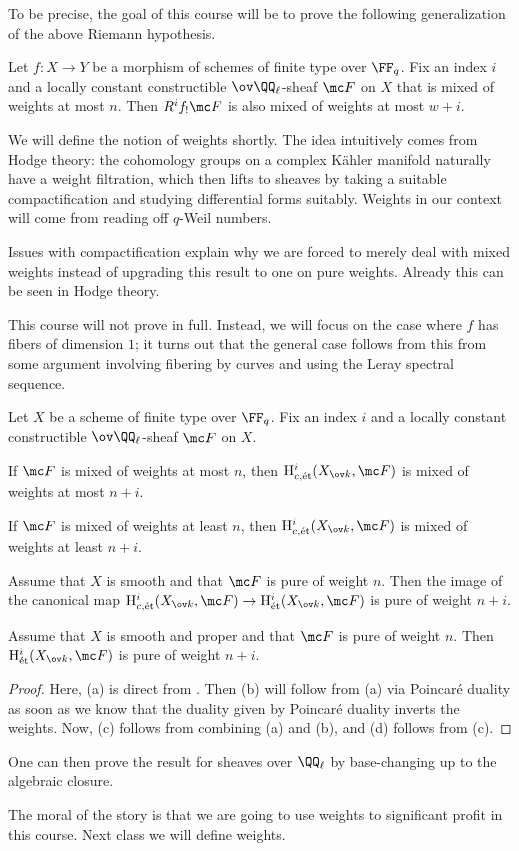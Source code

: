 \documentclass[../notes.tex]{subfiles}
\begin{document}
To be precise, the goal of this course will be to prove the following generalization of the above Riemann hypothesis.
\begin{theorem}[Deligne] \label{thm:weil-ii}
	Let $f\colon X\to Y$ be a morphism of schemes of finite type over $\FF_q$. Fix an index $i$ and a locally constant constructible $\ov\QQ_\ell$-sheaf $\mc F$ on $X$ that is mixed of weights at most $n$. Then $R^if_!\mc F$ is also mixed of weights at most $w+i$.
\end{theorem}
We will define the notion of weights shortly. The idea intuitively comes from Hodge theory: the cohomology groups on a complex K\"ahler manifold naturally have a weight filtration, which then lifts to sheaves by taking a suitable compactification and studying differential forms suitably. Weights in our context will come from reading off $q$-Weil numbers.
\begin{remark}
	Issues with compactification explain why we are forced to merely deal with mixed weights instead of upgrading this result to one on pure weights. Already this can be seen in Hodge theory.
\end{remark}
This course will not prove  in full. Instead, we will focus on the case where $f$ has fibers of dimension $1$; it turns out that the general case follows from this from some argument involving fibering by curves and using the Leray spectral sequence.
\begin{corollary}
	Let $X$ be a scheme of finite type over $\FF_q$. Fix an index $i$ and a locally constant constructible $\ov\QQ_\ell$-sheaf $\mc F$ on $X$.
	\begin{listalph}
		\item If $\mc F$ is mixed of weights at most $n$, then $\mathrm H^i_{c,\mathrm{\acute et}}(X_{\ov k},\mc F)$ is mixed of weights at most $n+i$.
		\item If $\mc F$ is mixed of weights at least $n$, then $\mathrm H^i_{c,\mathrm{\acute et}}(X_{\ov k},\mc F)$ is mixed of weights at least $n+i$.
		\item Assume that $X$ is smooth and that $\mc F$ is pure of weight $n$. Then the image of the canonical map $\mathrm H^i_{c,\mathrm{\acute et}}(X_{\ov k},\mc F)\to\mathrm H^i_{\mathrm{\acute et}}(X_{\ov k},\mc F)$ is pure of weight $n+i$.
		\item Assume that $X$ is smooth and proper and that $\mc F$ is pure of weight $n$. Then $\mathrm H^i_{\mathrm{\acute et}}(X_{\ov k},\mc F)$ is pure of weight $n+i$.
	\end{listalph}
\end{corollary}
\begin{proof}
	Here, (a) is direct from . Then (b) will follow from (a) via Poincar\'e duality as soon as we know that the duality given by Poincar\'e duality inverts the weights. Now, (c) follows from combining (a) and (b), and (d) follows from (c).
\end{proof}
\begin{remark}
	One can then prove the result for sheaves over $\QQ_\ell$ by base-changing up to the algebraic closure.
\end{remark}
The moral of the story is that we are going to use weights to significant profit in this course. Next class we will define weights.
\end{document}
